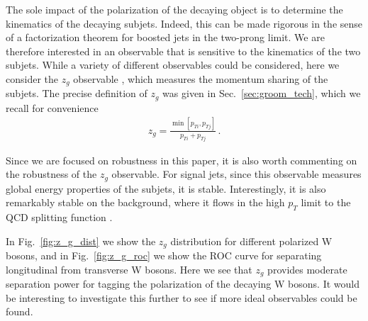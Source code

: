 \documentclass[11pt,letterpaper]{article}
\DeclareRobustCommand{\Sec}[1]{Sec.~\ref{#1}}
\DeclareRobustCommand{\Fig}[1]{Fig.~\ref{#1}}
\begin{document}
The sole impact of the polarization of the decaying object is to determine the kinematics of the decaying subjets.
%
Indeed, this can be made rigorous in the sense of a factorization theorem for boosted jets in the two-prong limit.
%
We are therefore interested in an observable that is sensitive to the kinematics of the two subjets.
%
While a variety of different observables could be considered, here we consider the $z_g$ observable \cite{Larkoski:2014wba,Larkoski:2014bia,Larkoski:2015lea}, which measures the momentum sharing of the subjets. The precise definition of $z_g$ was given in \Sec{sec:groom_tech}, which we recall for convenience
\begin{align}
z_g=\frac{\min\left[ p_{Ti}, p_{Tj}  \right]}{p_{Ti}+p_{Tj}}\,.
\end{align}

Since we are focused on robustness in this paper, it is also worth commenting on the robustness of the $z_g$ observable. For signal jets, since this observable measures global energy properties of the subjets, it is stable.
%
Interestingly, it is also remarkably stable on the background, where it flows in the high $p_T$ limit to the QCD splitting function \cite{Larkoski:2014wba,Larkoski:2014bia,Larkoski:2015lea}.


In \Fig{fig:z_g_dist} we show the $z_g$ distribution for different polarized W bosons, and in \Fig{fig:z_g_roc} we show  the ROC curve for separating longitudinal from transverse W bosons. Here we see that $z_g$ provides moderate separation power for tagging the polarization of the decaying W bosons. It would be interesting to investigate this further to see if more ideal observables could be found.
\end{document}
